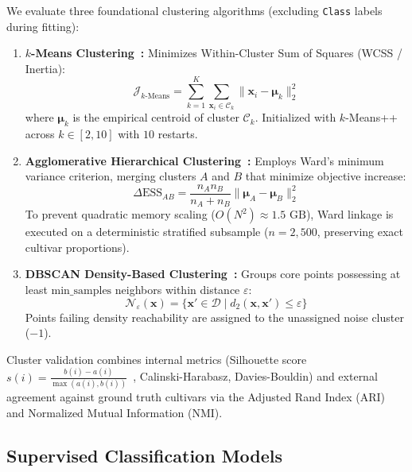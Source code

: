 \documentclass[11pt,a4paper]{article}
\begin{document}
We evaluate three foundational clustering algorithms (excluding \texttt{Class} labels during fitting):
\begin{enumerate}[leftmargin=1.5em]
    \item \textbf{$k$-Means Clustering~\citep{lloyd1982least}:} Minimizes Within-Cluster Sum of Squares (WCSS / Inertia):
    \begin{equation}
        \mathcal{J}_{k\text{-Means}} = \sum_{k=1}^K \sum_{\mathbf{x}_i \in \mathcal{C}_k} \|\mathbf{x}_i - \boldsymbol{\mu}_k\|_2^2
    \end{equation}
    where $\boldsymbol{\mu}_k$ is the empirical centroid of cluster $\mathcal{C}_k$. Initialized with $k$-Means++ across $k \in [2, 10]$ with $10$ restarts.
    \item \textbf{Agglomerative Hierarchical Clustering~\citep{ward1963hierarchical}:} Employs Ward's minimum variance criterion, merging clusters $A$ and $B$ that minimize objective increase:
    \begin{equation}
        \Delta \text{ESS}_{AB} = \frac{n_A n_B}{n_A + n_B} \|\boldsymbol{\mu}_A - \boldsymbol{\mu}_B\|_2^2
    \end{equation}
    To prevent quadratic memory scaling ($O(N^2) \approx 1.5\text{ GB}$), Ward linkage is executed on a deterministic stratified subsample ($n = 2{,}500$, preserving exact cultivar proportions).
    \item \textbf{DBSCAN Density-Based Clustering~\citep{ester1996density}:} Groups core points possessing at least $\text{min\_samples}$ neighbors within distance $\varepsilon$:
    \begin{equation}
        \mathcal{N}_\varepsilon(\mathbf{x}) = \{\mathbf{x}' \in \mathcal{D} \mid d_2(\mathbf{x}, \mathbf{x}') \le \varepsilon\}
    \end{equation}
    Points failing density reachability are assigned to the unassigned noise cluster ($-1$).
\end{enumerate}

Cluster validation combines internal metrics (Silhouette score $s(i) = \frac{b(i) - a(i)}{\max(a(i), b(i))}$~\citep{rousseeuw1987silhouettes}, Calinski-Harabasz, Davies-Bouldin) and external agreement against ground truth cultivars via the Adjusted Rand Index (ARI)~\citep{hubert1985comparing} and Normalized Mutual Information (NMI).

\subsection{Supervised Classification Models}
\label{subsec:meth_classification}
\end{document}
